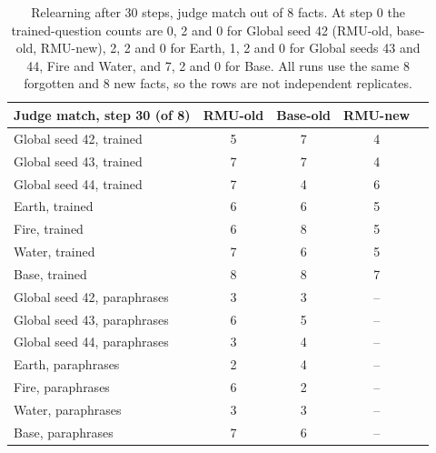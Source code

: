 \documentclass[10pt,twocolumn]{article}
\begin{document}
\begin{table}[tbp]
\centering\footnotesize
\setlength{\tabcolsep}{3pt}
\begin{tabular}{@{}lcccc@{}}
\toprule
Judge match, step 30 (of 8) & RMU-old & Base-old & RMU-new\\
\midrule
Global seed 42, trained     & 5 & 7 & 4\\
Global seed 43, trained     & 7 & 7 & 4\\
Global seed 44, trained     & 7 & 4 & 6\\
Earth, trained              & 6 & 6 & 5\\
Fire, trained               & 6 & 8 & 5\\
Water, trained              & 7 & 6 & 5\\
Base, trained               & 8 & 8 & 7\\
Global seed 42, paraphrases & 3 & 3 & --\\
Global seed 43, paraphrases & 6 & 5 & --\\
Global seed 44, paraphrases & 3 & 4 & --\\
Earth, paraphrases          & 2 & 4 & --\\
Fire, paraphrases           & 6 & 2 & --\\
Water, paraphrases          & 3 & 3 & --\\
Base, paraphrases           & 7 & 6 & --\\
\bottomrule
\end{tabular}
\caption{Relearning after 30 steps, judge match out of 8 facts. At step 0 the trained-question counts are 0, 2 and 0 for Global seed 42 (RMU-old, base-old, RMU-new), 2, 2 and 0 for Earth, 1, 2 and 0 for Global seeds 43 and 44, Fire and Water, and 7, 2 and 0 for Base. All runs use the same 8 forgotten and 8 new facts, so the rows are not independent replicates.}
\label{tab:relearn}
\end{table}
\end{document}
